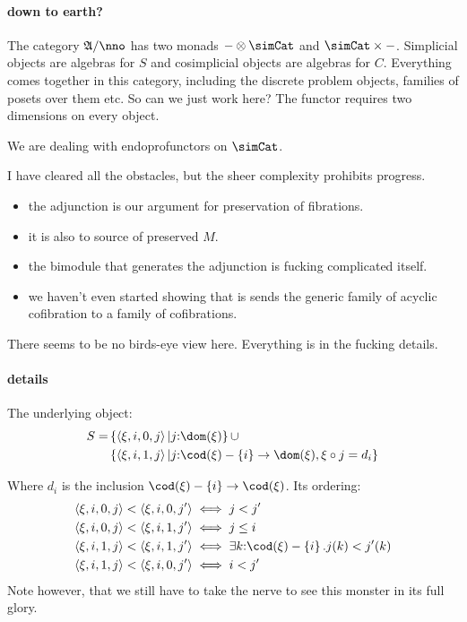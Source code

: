 \documentclass[csh.tex]{subfiles}
\begin{document}
\paragraph{down to earth?}
The category $\ambient/\nno$ has two monads $-\otimes\simCat$ and $\simCat\times-$. Simplicial objects are algebras for $S$ and cosimplicial objects are algebras for $C$. Everything comes together in this category, including the discrete problem objects, families of posets over them etc. So can we just work here? The functor requires two dimensions on every object.

We are dealing with endoprofunctors on $\simCat$.

I have cleared all the obstacles, but the sheer complexity prohibits progress.

\begin{itemize}
\item the adjunction is our argument for preservation of fibrations.
\item it is also to source of preserved $M$.
\item the bimodule that generates the adjunction is fucking complicated itself.
\item we haven't even started showing that is sends the generic family of acyclic cofibration to a family of cofibrations.
\end{itemize}

There seems to be no birds-eye view here. Everything is in the fucking details.

\paragraph{details}
The underlying object:
\begin{align*} S = &\set{\tuplet{\xi,i,0,j}| j\of \dom(\xi)} \cup\\
&\set{\tuplet{\xi,i,1,j}| j\of \cod(\xi) - \set i\to\dom(\xi),\xi\circ j = d_i}\\
\end{align*}

Where $d_i$ is the inclusion $\cod(\xi) - \set i \to \cod(\xi)$.
Its ordering:
\begin{align*}
\tuplet{\xi,i,0,j} < \tuplet{\xi,i,0,j'}&\iff j< j'\\
\tuplet{\xi,i,0,j} < \tuplet{\xi,i,1,j'}&\iff j\leq i\\
\tuplet{\xi,i,1,j} < \tuplet{\xi,i,1,j'}&\iff \exists k\of \cod(\xi) - \set i. j(k) < j'(k) \\
\tuplet{\xi,i,1,j} < \tuplet{\xi,i,0,j'}&\iff i < j'
\end{align*}
Note however, that we still have to take the nerve to see this monster in its full glory.
\end{document}

